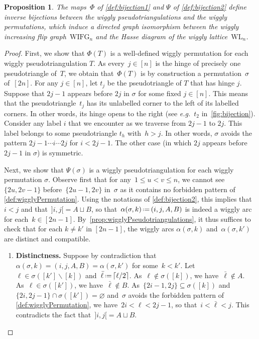\documentclass{amsart}
\newtheorem{proposition}[theorem]{Proposition}
\theoremstyle{definition}
\newcommand{\ssm}{\smallsetminus} %
\newcommand{\eqdef}{\mbox{\,\raisebox{0.2ex}{\scriptsize\ensuremath{\mathrm:}}\ensuremath{=}\,}} %
\newcommand{\eg}{\textit{e.g.}~} %
\newcommand{\wigglyIncreasingFlipGraph}{\mathrm{WIFG}} %
\newcommand{\wigglyLattice}{\mathrm{WL}} %
\begin{document}
\begin{proposition}
\label{prop:bijection}
The maps~$\Phi$ of \cref{def:bijection1} and $\Psi$ of \cref{def:bijection2} define inverse bijections between the wiggly pseudotriangulations and the wiggly permutations, which induce a directed graph isomorphism between the wiggly increasing flip graph~$\wigglyIncreasingFlipGraph_n$ and the Hasse diagram of the wiggly lattice~$\wigglyLattice_n$.
\end{proposition}

\begin{proof}
First, we show that \(\Phi(T)\) is a well-defined wiggly permutation for each wiggly pseudotriangulation \(T\).
As every~$j \in [n]$ is the hinge of precisely one pseudotriangle of~$T$, we obtain that~\(\Phi(T)\) is by construction a permutation~$\sigma$ of~$[2n]$.
For any \(j \in [n]\), let \(t_j\) be the pseudotriangle of \(T\) that has hinge \(j\).
Suppose that \(2j-1\) appears before \(2j\) in \(\sigma\) for some fixed \(j \in [n]\).
This means that the pseudotriangle~\(t_j\) has its unlabelled corner to the left of its labelled corners.
In other words, its hinge opens to the right (see \eg $t_2$ in~\cref{fig:bijection}).
Consider any label \(i\) that we encounter as we traverse from \(2j-1\) to \(2j\).
This label belongs to some pseudotriangle \(t_h\) with~$h > j$.
In other words, \(\sigma\) avoids the pattern \(2j-1 \cdots i \cdots 2j\) for \(i < 2j-1\).
The other case (in which \(2j\) appears before \(2j-1\) in \(\sigma\)) is symmetric.

Next, we show that \(\Psi(\sigma)\) is a wiggly pseudotriangulation for each wiggly permutation \(\sigma\).
Observe first that for any~$1 \le u < v \le n$, we cannot see~$\{2u, 2v-1\}$ before~$\{2u-1, 2v\}$ in~$\sigma$ as it contains no forbidden pattern of \cref{def:wigglyPermutation}.
Using the notations of \cref{def:bijection2}, this implies that~$i < j$ and that~${]i,j[} = A \sqcup B$, so that~$\alpha(\sigma,k) \eqdef (i, j, A, B)$ is indeed a wiggly arc for each~$k \in [2n-1]$.
By~\cref{prop:wigglyPseudotriangulations}, it thus suffices to check that for each \(k \neq k'\) in \([2n-1]\), the wiggly arcs 
\(\alpha(\sigma,k)\) and~\(\alpha(\sigma,k')\) are distinct and compatible.
\begin{enumerate}
\item \textbf{Distinctness.}
Suppose by contradiction that \(\alpha(\sigma,k) = (i,j,A,B) = \alpha(\sigma,k')\) for some~\({k < k'}\).
Let~${\ell \in \sigma([k'] \ssm [k])}$ and~$\bar\ell \eqdef \lceil \ell/2 \rceil$.
As~$\ell \notin \sigma([k])$, we have~$\bar\ell \notin A$.
As~$\ell \in \sigma([k'])$, we have~$\bar\ell \notin B$.
As~$\{2i-1, 2j\} \subseteq \sigma([k])$ and~$\{2i, 2j-1\} \cap \sigma([k']) = \varnothing$ and~$\sigma$ avoids the forbidden pattern of \cref{def:wigglyPermutation}, we have~$2i < \ell < 2j-1$, so that~$i < \bar\ell < j$.
This contradicts the fact that~${]i,j[} = A \sqcup B$.


\end{enumerate}
\end{proof}
\end{document}
